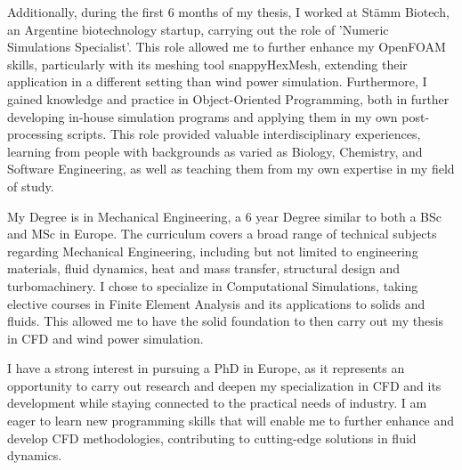 \documentclass{letter}
\begin{document}
\begin{letter}{}
Additionally, during the first 6 months of my thesis, I worked at Stämm Biotech, an Argentine biotechnology startup, carrying out the role of 'Numeric Simulations Specialist'. 
  This role allowed me to further enhance my OpenFOAM skills, particularly with its meshing tool snappyHexMesh, extending their application in a different setting than wind power simulation. 
  Furthermore, I gained knowledge and practice in Object-Oriented Programming, both in further developing in-house simulation programs and applying them in my own post-processing scripts. 
  This role provided valuable interdisciplinary experiences, learning from people with backgrounds as varied as Biology, Chemistry, and Software Engineering, as well as teaching them from my own expertise in my field of study.

My Degree is in Mechanical Engineering, a 6 year Degree similar to both a BSc and MSc in Europe.
The curriculum covers a broad range of technical subjects regarding Mechanical Engineering, including but not limited to engineering materials, fluid dynamics, heat and mass transfer, structural design and turbomachinery. 
I chose to specialize in Computational Simulations, taking elective courses in Finite Element Analysis and its applications to solids and fluids.
This allowed me to have the solid foundation to then carry out my thesis in CFD and wind power simulation.

  
I have a strong interest in pursuing a PhD in Europe, as it represents an opportunity to carry out research and deepen my specialization in CFD and its development while staying connected to the practical needs of industry.
   I am eager to learn new programming skills that will enable me to further enhance and develop CFD methodologies, contributing to cutting-edge solutions in fluid dynamics.


\end{letter}
\end{document}
